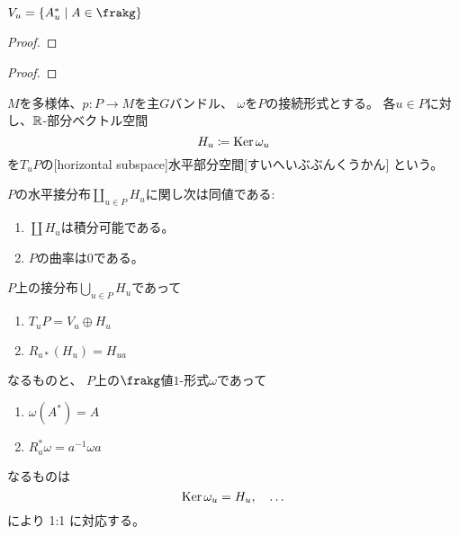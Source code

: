 \documentclass[report]{jlreq}
\begin{document}
\begin{proposition}
    $V_u = \{ A^*_u \mid A \in \frakg \}$
\end{proposition}

\begin{proof}
    \TODO{}
\end{proof}

\begin{theorem}[垂直接分布は積分可能]
    \TODO{}
\end{theorem}

\begin{proof}
    \TODO{}
\end{proof}

\begin{definition}[水平部分空間]
    $M$を多様体、$p \colon P \to M$を主$G$バンドル、
    $\omega$を$P$の接続形式とする。
    各$u \in P$に対し、$\mathbb{R}$-部分ベクトル空間
    \begin{equation}
        H_u \coloneqq \operatorname{\mathrm{Ker}} \omega_u
    \end{equation}
    を$T_uP$の[horizontal subspace]{水平部分空間}[すいへいぶぶんくうかん]
    という。
\end{definition}

\begin{theorem}[水平接分布の積分可能性]
    $P$の水平接分布$\coprod_{u \in P} H_u$に関し次は同値である:
    \begin{enumerate}
        \item $\coprod H_u$は積分可能である。
        \item $P$の曲率は$0$である。
    \end{enumerate}
\end{theorem}

\begin{theorem}[水平接分布による接続の特徴付け]
    $P$上の接分布$\bigcup_{u \in P} H_u$であって
    \begin{enumerate}[label=(1-\roman*)]
        \item $T_uP = V_u \oplus H_u$
        \item $R_{a*} (H_u) = H_{ua}$
    \end{enumerate}
    なるものと、
    $P$上の$\frakg$値$1$-形式$\omega$であって
    \begin{enumerate}[label=(2-\roman*)]
        \item $\omega(A^*) = A$
        \item $R_a^* \omega = a^{-1} \omega a$
    \end{enumerate}
    なるものは
    \begin{equation}
        \operatorname{\mathrm{Ker}} \omega_u = H_u,
        \quad
        \dots
    \end{equation}
    により 1:1 に対応する。
    \TODO{}
\end{theorem}
\end{document}
